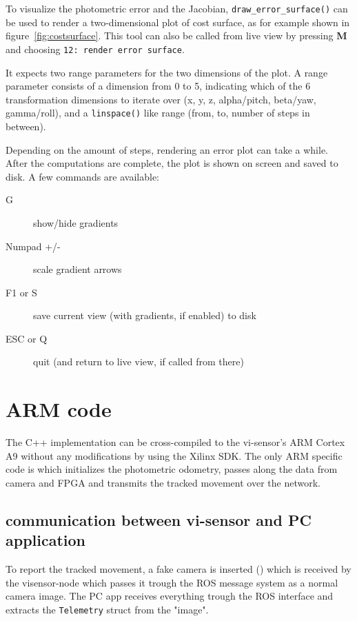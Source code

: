 To visualize the photometric error and the Jacobian,
\texttt{draw\_error\_surface()} can be used to render a two-dimensional plot of
cost surface, as for example shown in figure~\ref{fig:costsurface}. This tool
can also be called from live view by pressing \textbf{M} and choosing \texttt{12:
render error surface}.

It expects two range parameters for the two dimensions of the plot. A range
parameter consists of a dimension from 0 to 5, indicating which of the 6
transformation dimensions to iterate over (x, y, z, alpha/pitch, beta/yaw,
gamma/roll), and a \texttt{linspace()} like range (from, to, number of steps in
between).

Depending on the amount of steps, rendering an error plot can take a while.
After the computations are complete, the plot is shown on screen and saved to
disk. A few commands are available:

\begin{description}
    \item[G] show/hide gradients
    \item[Numpad +/-] scale gradient arrows
    \item[F1 or S] save current view (with gradients, if enabled) to disk
    \item[ESC or Q] quit (and return to live view, if called from there)
\end{description}


\section{ARM code}

The C++ implementation can be cross-compiled to the vi-sensor's ARM Cortex A9
without any modifications by using the Xilinx SDK. The only ARM specific code
is  which initializes the photometric odometry, passes
along the data from camera and FPGA and transmits the tracked movement over the
network.

\subsection{communication between vi-sensor and PC application}

To report the tracked movement, a fake camera is inserted
() which is received by the
visensor-node which passes it trough the ROS message system as a normal camera
image. The PC app receives everything trough the ROS interface and extracts the
\texttt{Telemetry} struct from the "image".


